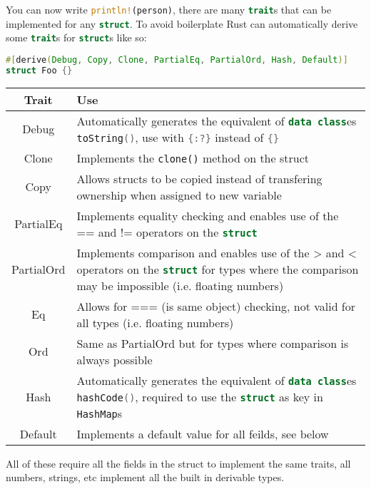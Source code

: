 \documentclass[a4paper,11pt]{article}
\begin{document}
You can now write \lstinline[language=Rust]{println!(person)}, there are many \lstinline[language=Rust]{trait}s that can be implemented for any \lstinline[language=Rust]{struct}.\newline
To avoid boilerplate Rust can automatically derive some \lstinline[language=Rust]{trait}s for \lstinline[language=Rust]{struct}s like so:
\begin{lstlisting}[language=Rust,frame=single]
#[derive(Debug, Copy, Clone, PartialEq, PartialOrd, Hash, Default)]
struct Foo {}
\end{lstlisting}

\begin{center}
\begin{tabular}{ |c|p{12cm}| } 
 \hline
 Trait & Use \\ 
 \hline
 Debug & Automatically generates the equivalent of \lstinline[language=Kotlin]|data class|es \lstinline[language=Kotlin]|toString()|, use with \lstinline[language=Rust]|{:?}| instead of \lstinline[language=Rust]|{}| \\
 Clone & Implements the \lstinline[language=Rust]|clone()| method on the struct \\
 Copy & Allows structs to be copied instead of transfering ownership when assigned to new variable \\
 PartialEq & Implements equality checking and enables use of the == and != operators on the \lstinline[language=Rust]|struct| \\
 PartialOrd & Implements comparison and enables use of the > and < operators on the \lstinline[language=Rust]|struct| for types where the comparison may be impossible (i.e. floating numbers)\\
 Eq & Allows for === (is same object) checking, not valid for all types (i.e. floating numbers) \\
 Ord & Same as PartialOrd but for types where comparison is always possible\\
 Hash & Automatically generates the equivalent of \lstinline[language=Kotlin]|data class|es \lstinline[language=Kotlin]|hashCode()|, required to use the \lstinline[language=Rust]|struct| as key in \lstinline[language=Rust]|HashMap|s \\
 Default & Implements a default value for all feilds, see below \\
 \hline
\end{tabular}
\end{center}

All of these require all the fields in the struct to implement the same traits, all numbers, strings, etc implement all the built in derivable types.
\end{document}
